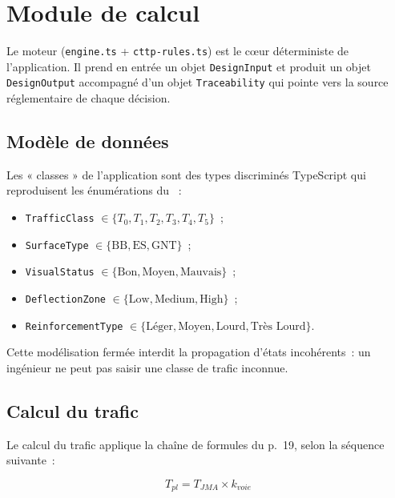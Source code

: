 \section{Module de calcul \cttp{}}
\label{sec:moteur-cttp}

Le moteur \cttp{} (\texttt{engine.ts} + \texttt{cttp-rules.ts}) est le
cœur déterministe de l'application. Il prend en entrée un objet
\texttt{DesignInput} et produit un objet \texttt{DesignOutput}
accompagné d'un objet \texttt{Traceability} qui pointe vers la source
réglementaire de chaque décision.

\subsection{Modèle de données}
\label{sec:modele}

Les « classes » de l'application sont des types discriminés
TypeScript qui reproduisent les énumérations du \cttp{}~:

\begin{itemize}
  \item \texttt{TrafficClass} $\in \{T_0, T_1, T_2, T_3, T_4, T_5\}$~;
  \item \texttt{SurfaceType} $\in \{\text{BB}, \text{ES}, \text{GNT}\}$~;
  \item \texttt{VisualStatus} $\in \{\text{Bon}, \text{Moyen},
        \text{Mauvais}\}$~;
  \item \texttt{DeflectionZone} $\in \{\text{Low}, \text{Medium},
        \text{High}\}$~;
  \item \texttt{ReinforcementType} $\in \{\text{Léger}, \text{Moyen},
        \text{Lourd}, \text{Très Lourd}\}$.
\end{itemize}

Cette modélisation fermée interdit la propagation d'états incohérents~:
un ingénieur ne peut pas saisir une classe de trafic inconnue.

\subsection{Calcul du trafic}
\label{sec:calcul-trafic}

Le calcul du trafic applique la chaîne de formules du \cttp{} p.~19,
selon la séquence suivante~:

\begin{equation}
  T_{pl} = T_{JMA} \times k_{voie}
  \label{eq:tpl}
\end{equation}

